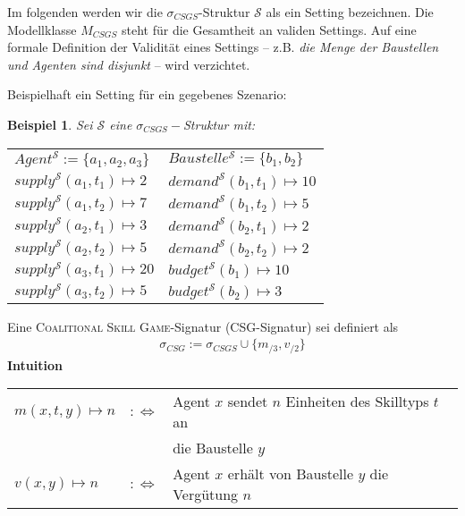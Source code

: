 \documentclass[sigconf]{acmart}
\theoremstyle{break}
\newtheorem{bsp}{Beispiel}
\begin{document}
\noindent
Im folgenden werden wir die $\sigma_{CSGS}$-Struktur $\mathcal{S}$ als ein Setting bezeichnen. Die Modellklasse $M_{CSGS}$ steht für die Gesamtheit an validen Settings.
Auf eine formale Definition der Validität eines Settings -- z.B. \textit{die Menge der Baustellen und Agenten sind disjunkt} -- wird verzichtet.

\newpage \noindent
Beispielhaft ein Setting für ein gegebenes Szenario:
\begin{bsp}
  Sei $\mathcal{S}$ eine $\sigma_{CSGS}-$Struktur mit:\\

  \noindent
  \setlength{\tabcolsep}{24pt}
  \begin{tabular}{l|l}
    $Agent^\mathcal{S} := \{a_1, a_2, a_3\}$ & $Baustelle^\mathcal{S} := \{b_1, b_2\}$ \\
    $supply^\mathcal{S}(a_1, t_1)\mapsto 2 $ & $demand^\mathcal{S}(b_1, t_1)\mapsto 10$\\
    $supply^\mathcal{S}(a_1, t_2)\mapsto 7 $ & $demand^\mathcal{S}(b_1, t_2)\mapsto 5 $\\
    $supply^\mathcal{S}(a_2, t_1)\mapsto 3 $ & $demand^\mathcal{S}(b_2, t_1)\mapsto 2 $\\
    $supply^\mathcal{S}(a_2, t_2)\mapsto 5 $ & $demand^\mathcal{S}(b_2, t_2)\mapsto 2 $\\
    $supply^\mathcal{S}(a_3, t_1)\mapsto 20$ & $budget^\mathcal{S}(b_1)\mapsto 10$\\
    $supply^\mathcal{S}(a_3, t_2)\mapsto 5 $ & $budget^\mathcal{S}(b_2)\mapsto 3 $\\
  \end{tabular}
\end{bsp}

\begin{definition}[CSG]
  Eine \textsc{Coalitional Skill Game}-Signatur (CSG-Signatur) sei definiert als
  \begin{align*}
    \sigma_{CSG}:=\sigma_{CSGS}\cup\{m_{/3}, v_{/2}\}
  \end{align*}
  \noindent
  \textbf{Intuition} \\
    \begin{tabular}{lrl}
    $m(x, t, y)\mapsto n$&$:\Leftrightarrow$& Agent $x$ sendet $n$ Einheiten des Skilltyps $t$ an \\&&die Baustelle $y$ \\
    $v(x,y)\mapsto n$&$:\Leftrightarrow$& Agent $x$ erhält von Baustelle $y$ die Vergütung $n$
    \end{tabular}
\end{definition}
\end{document}
